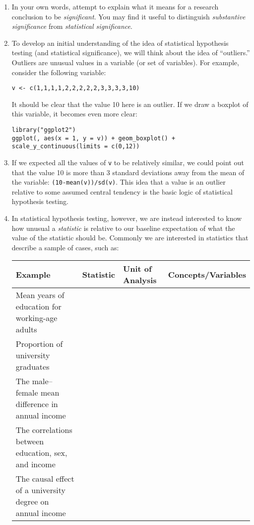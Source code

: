 \documentclass[a4paper,12pt]{article}
\begin{document}
\begin{enumerate}

\item In your own words, attempt to explain what it means for a research conclusion to be \textit{significant}. You may find it useful to distinguish \textit{substantive significance} from \textit{statistical significance}.

\vspace{4em}

\item To develop an initial understanding of the idea of statistical hypothesis testing (and statistical significance), we will think about the idea of ``outliers.'' Outliers are unusual values in a variable (or set of variables). For example, consider the following variable:

\begin{verbatim}
v <- c(1,1,1,1,2,2,2,2,2,3,3,3,3,10)
\end{verbatim}

\noindent It should be clear that the value 10 here is an outlier. If we draw a boxplot of this variable, it becomes even more clear:

\begin{verbatim}
library("ggplot2")
ggplot(, aes(x = 1, y = v)) + geom_boxplot() + scale_y_continuous(limits = c(0,12))
\end{verbatim}

\item If we expected all the values of \texttt{v} to be relatively similar, we could point out that the value 10 is more than 3 standard deviations away from the mean of the variable: \texttt{(10-mean(v))/sd(v)}. This idea that a value is an outlier relative to some assumed central tendency is the basic logic of statistical hypothesis testing.

\item In statistical hypothesis testing, however, we are instead interested to know how unusual a \textit{statistic} is relative to our baseline expectation of what the value of the statistic should be. Commonly we are interested in statistics that describe a sample of cases, such as:

\begin{tabular}{p{2in} p{1.3in} p{1.3in} p{1.5in}}\toprule
\textbf{Example} & \textbf{Statistic} & \textbf{Unit of Analysis} & \textbf{Concepts/Variables} \\ \midrule
Mean years of education for working-age adults &  &  \\ \midrule
Proportion of university graduates &  &  \\ \midrule
The male--female mean difference in annual income &  &  \\ \midrule
The correlations between education, sex, and income &  &  \\ \midrule
The causal effect of a university degree on annual income &  &  \\ \bottomrule
\end{tabular}


\end{enumerate}
\end{document}
